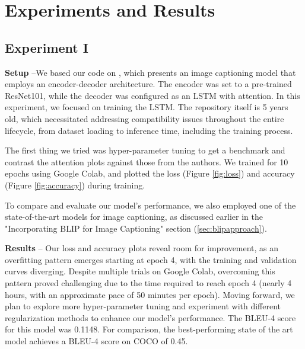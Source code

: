 \documentclass[10pt,twocolumn,letterpaper]{article}
\begin{document}
\section{Experiments and Results}

\subsection{Experiment I}

\textbf{Setup} --We based our code on \cite{sagar2018}, which presents an image captioning model that employs an encoder-decoder architecture. The encoder was set to a pre-trained ResNet101, while the decoder was configured as an LSTM with attention. In this experiment, we focused on training the LSTM. The repository itself is 5 years old, which necessitated addressing compatibility issues throughout the entire lifecycle, from dataset loading to inference time, including the training process.

The first thing we tried was hyper-parameter tuning to get a benchmark and contrast the attention plots against those from the authors. We trained for 10 epochs using Google Colab, and plotted the loss (Figure \ref{fig:loss}) and accuracy (Figure \ref{fig:accuracy}) during training.

To compare and evaluate our model's performance, we also employed one of the state-of-the-art models for image captioning, as discussed earlier in the "Incorporating BLIP for Image Captioning" section (\ref{sec:blipapproach}). 

\textbf{Results} -- Our loss and accuracy plots reveal room for improvement, as an overfitting pattern emerges starting at epoch 4, with the training and validation curves diverging. Despite multiple trials on Google Colab, overcoming this pattern proved challenging due to the time required to reach epoch 4 (nearly 4 hours, with an approximate pace of 50 minutes per epoch). Moving forward, we plan to explore more hyper-parameter tuning and experiment with different regularization methods to enhance our model's performance. The BLEU-4 score for this model was 0.1148. For comparison, the best-performing state of the art model achieves a BLEU-4 score on COCO of 0.45.
\end{document}
